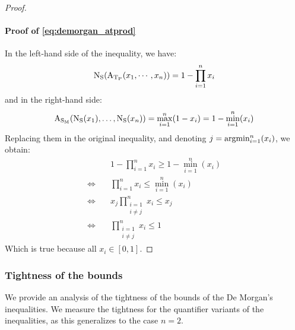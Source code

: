 \begin{proof}
    \paragraph{Proof of \eqref{eq:demorgan_atprod}}
    In the left-hand side of the inequality, we have:
    \begin{equation}
        \operatorname{N_{S}}(\operatorname{A_{\operatorname{T_{P}}}}(x_1,\cdots,x_n)) = 1-\prod_{i=1}^{n} x_i
    \end{equation}
    and in the right-hand side:
    \begin{equation}
        \operatorname{A_{\operatorname{S_{M}}}}(\operatorname{N_{S}}(x_1),\dots,\operatorname{N_{S}}(x_n)) = \max_{i=1}^n (1-x_i) = 1-\min_{i=1}^n (x_i)
    \end{equation}
    Replacing them in the original inequality, and denoting $j = \operatorname{argmin}_{i=1}^n (x_i)$, we obtain:
    \begin{align}
        & \quad 1-\prod_{i=1}^{n} x_i \geq 1-\min_{i=1}^n (x_i) \\
        \iff & \quad \prod_{i=1}^{n} x_i \leq \min_{i=1}^n (x_i) \\
        \iff & \quad x_j \prod_{\substack{i=1\\i\neq j}}^n x_i \leq x_j \\
        \iff & \quad \prod_{\substack{i=1\\i\neq j}}^n x_i \leq 1
    \end{align}
    Which is true because all $x_i \in [0,1]$.
\end{proof}

\subsubsection{Tightness of the bounds}
\label{appendix:bound_tightness}
We provide an analysis of the tightness of the bounds of the De Morgan's inequalities.
We measure the tightness for the quantifier variants of the inequalities, as this generalizes to the case $n=2$.
